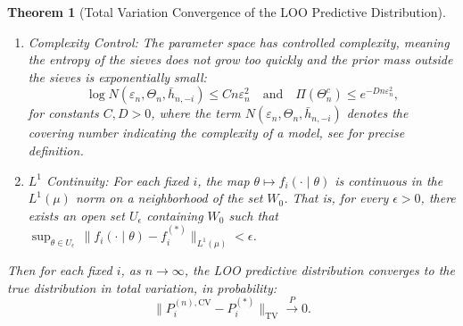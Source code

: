 \documentclass[
  12pt]{article}
\theoremstyle{plain}
\newtheorem{theorem}{Theorem}[section]
\theoremstyle{definition}
\theoremstyle{remark}
\begin{document}
\begin{theorem}[Total Variation Convergence of the LOO Predictive Distribution]
\begin{enumerate}
    \item[\textnormal{(iv)}] Complexity Control: The parameter space has controlled complexity, meaning the entropy of the sieves does not grow too quickly and the prior mass outside the sieves is exponentially small:
    \begin{equation} \log N(\varepsilon_n, \Theta_n, \bar h_{n,-i})\le C n\varepsilon_n^2 \quad \text{and} \quad \Pi(\Theta_n^c) \le e^{-D n\varepsilon_n^2},\end{equation}
    for constants $C,D > 0$, where the term $N(\varepsilon_n, \Theta_n, \bar h_{n,-i})$ denotes the covering number indicating the complexity of a model, see \citet{ghosal2007convergence} for precise definition.

    \item[\textnormal{(v)}] $L^1$ Continuity: For each fixed $i$, the map $\theta \mapsto f_i(\cdot\mid\theta)$ is continuous in the $L^1(\mu)$ norm on a neighborhood of the set $W_0$. That is, for every $\epsilon>0$, there exists an open set $U_\epsilon$ containing $W_0$ such that $\sup_{\theta\in U_\epsilon}\,\|f_i(\cdot\mid\theta)-f_i^{(*)}\|_{L^1(\mu)}<\epsilon$.
\end{enumerate}
Then for each fixed $i$, as $n\to\infty$, the LOO predictive distribution converges to the true distribution in total variation, in probability:
\begin{equation}\big\|P_i^{(n),\mathrm{CV}}-P_i^{(*)}\big\|_{\mathrm{TV}} \xrightarrow{P} 0.\end{equation}
\end{theorem}
\end{document}
